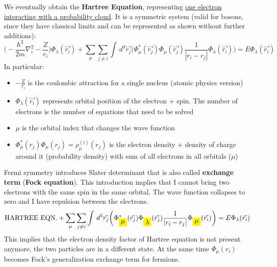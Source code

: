 We eventually obtain the \textbf{Hartree Equation}, representing \ul{one electron interacting with a probability cloud}. It is a symmetric system (valid for bosons, since they have classical limits and can be represented as shown without further additions):
\[
\bigg(-\frac{\hbar^2}{2m}\nabla^2_i-\frac{Z}{r_i}\bigg)\Phi_\lambda(\vec{r_i})+\sum_\mu \sum_{j \neq i} \int\,d^3\vec{r_j}\bigg(\Phi^*_\mu(\vec{r_j})\Phi_\mu(\vec{r_j})\frac{1}{|r_i-r_j|}\Phi_\lambda(\vec{r_i})\bigg)=E\Phi_\lambda(\vec{r_i})
\]
In particular:
\begin{itemize}
	\item $-\frac{Z}{r_i}$ is the coulombic attraction for a single nucleus (atomic physics version)
	\item $\Phi_\lambda(\vec{r_i})$ represents orbital position of the electron + spin. The number of electrons is the number of equations that need to be solved
	\item $\mu$ is the orbital index that changes the wave function
	\item $\Phi^*_\mu(r_j)\Phi_\mu(r_j) = \rho_\mu^{(i)}(r_j)$ is the electron density + density of charge around it (probability density) with sum of all electrons in all orbitals ($\mu$)
\end{itemize}
Fermi symmetry introduces Slater determinant that is also called \textbf{exchange term} (\textbf{Fock equation}). This introduction implies that I cannot bring two electrons with the same spin in the same orbital. The wave function collapses to zero and I have repulsion between the electrons.\\
\[
\text{HARTREE EQN.}+
\sum_\mu \sum_{j \neq i} \int\,d^3\vec{r_j}\bigg(\Phi^*_{\mathcolorbox{yellow}{\mu}}(\vec{r_j})\Phi_{\mathcolorbox{yellow}{\lambda}}(\vec{r_j})\frac{1}{|r_i-r_j|}\Phi_{\mathcolorbox{yellow}{\mu}}(\vec{r_i})\bigg)=E\Phi_\lambda(\vec{r_i})
\]
This implies that the electron density factor of Hartree equation is not present anymore, the two particles are in a different state. At the same time $\Phi_\mu(r_i)$ becomes Fock's generalization exchange term for fermions.\\


